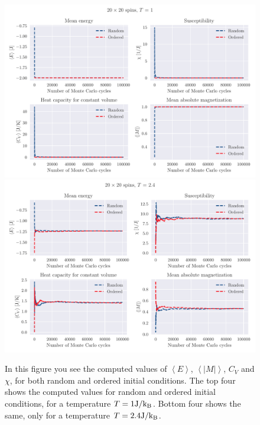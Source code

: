 \documentclass[reprint, english,notitlepage,nofootinbib]{revtex4-1}  %
\begin{document}
\begin{figure}[!htb]
	\includegraphics[width=16cm]{../output/de/L20-T1-dT0_0-NT1-N5-ExpVals.pdf}
	\includegraphics[width=16cm]{../output/de/L20-T2_4-dT0_0-NT1-N5-ExpVals.pdf}
	\caption{In this figure you see the computed values of $\left<E\right>$, $\left<|M|\right>$, $C_V$ and $\chi$, for both random and ordered initial conditions. The top four shows the computed values for random and ordered initial conditions, for a temperature $T=1\rm{J}/k_B$. Bottom four shows the same, only for a temperature $T=2.4\rm{J}/k_B$.}
	\label{fig:L20_T1_and_T2_4}
\end{figure}
\end{document}
